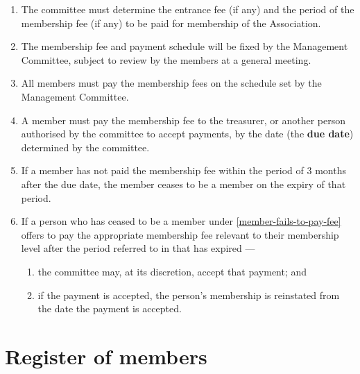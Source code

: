 \documentclass[../constitution.tex]{subfiles}
\begin{document}
\begin{enumerate}

\item The committee must determine the entrance fee (if any) and the period of  the membership fee (if any) to be paid for membership of the Association.
\item The membership fee and payment schedule will be fixed by the Management Committee, subject to review by the members at a general meeting.
\item All members must pay the membership fees on the schedule set by the Management Committee.
\item A member must pay the membership fee to the treasurer, or another person authorised by the committee to accept payments, by the date (the \textbf{due date}) determined by the committee. \label{member-must-pay-fee}
\item If a member has not paid the membership fee within the period of 3 months after the due date, the member ceases to be a member on the expiry of that period. \label{member-fails-to-pay-fee}
\item If a person who has ceased to be a member under  \ref{member-fails-to-pay-fee} offers to pay the appropriate membership fee relevant to their membership level  after the period referred to in that  has expired ---

  \begin{enumerate}
  
  \item the committee may, at its discretion, accept that payment; and
  \item if the payment is accepted, the person's membership is reinstated from the date the payment is accepted.
  \end{enumerate}
\end{enumerate}

\hypertarget{division-3-register-of-members}{%
\section{Register of members}\label{division-3-register-of-members}}
\end{document}
